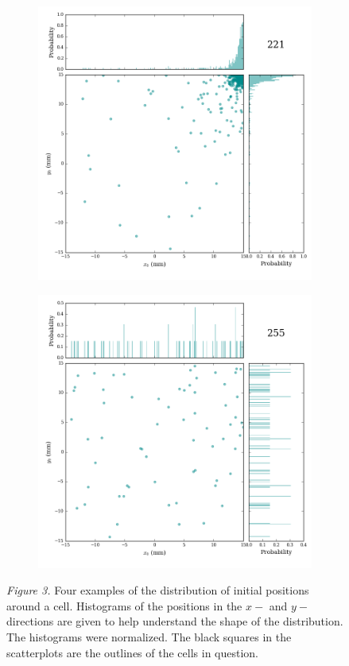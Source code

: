 \documentclass[12pt]{article}
\begin{document}
\begin{figure}
\medskip
\centering
\begin{subfigure}{.5\textwidth}
  \centering
  \includegraphics[width=\linewidth]{../figures/cellfigs/cell221.png}
  \label{fig:sub1}
\end{subfigure}%
\begin{subfigure}{.5\textwidth}
  \centering
  \includegraphics[width=\linewidth]{../figures/cellfigs/cell255.png}
  \label{fig:sub2}
\end{subfigure}
\label{fig:test}
\textit{Figure 3.} Four examples of the distribution of initial positions around a cell. Histograms of the positions in the $x-$ and $y-$directions are given to help understand the shape of the distribution. The histograms were normalized. The black squares in the scatterplots are the outlines of the cells in question.
\end{figure}
\end{document}
